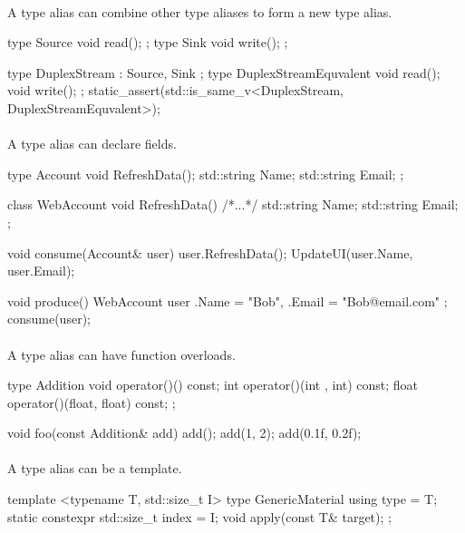 \documentclass{article}
\begin{document}
\paragraph{}
A type alias can combine other type aliases to form a new type alias.
\begin{codeblock}
type Source{ void read(); };
type Sink{ void write(); };

type DuplexStream : Source, Sink {};
type DuplexStreamEquvalent {
  void read();
  void write();
};
static_assert(std::is_same_v<DuplexStream, DuplexStreamEquvalent>);
\end{codeblock}

\paragraph{}
A type alias can declare fields.
\begin{codeblock}
type Account {
  void RefreshData();
  std::string Name;
  std::string Email;
};

class WebAccount {
  void RefreshData() { /*...*/ }
  std::string Name;
  std::string Email;
};

void consume(Account& user) {
  user.RefreshData();
  UpdateUI(user.Name, user.Email);
}

void produce() {
  WebAccount user{ .Name = "Bob", .Email = "Bob@email.com" };
  consume(user);
}
\end{codeblock}

\paragraph{}
A type alias can have function overloads.

\begin{codeblock}
type Addition {
  void operator()() const;
  int operator()(int , int) const;
  float operator()(float, float) const;
};

void foo(const Addition& add) {
  add();
  add(1, 2);
  add(0.1f, 0.2f);
}
\end{codeblock}

\paragraph{}
A type alias can be a template.
\begin{codeblock}
template <typename T, std::size_t I>
type GenericMaterial {
  using type = T;
  static constexpr std::size_t index = I;
  void apply(const T& target);
};
\end{codeblock}
\end{document}
